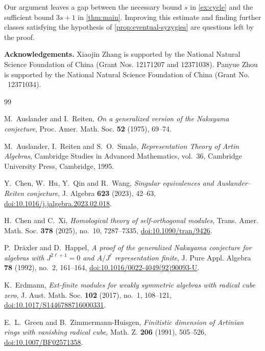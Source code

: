 \documentclass[a4paper,reqno]{amsart}
\numberwithin{equation}{section}
\begin{document}
Our argument leaves a gap between the necessary bound $s$ in
\cref{ex:cycle} and the sufficient bound $3s+1$ in \cref{thm:main}.
Improving this estimate and finding further classes satisfying the
hypothesis of \cref{prop:eventual-syzygies} are questions left by
the proof.

\textbf{Acknowledgements.} Xiaojin Zhang is supported by the National Natural Science Foundation of China (Grant Nos. 12171207 and 12371038). Panyue Zhou is supported by the National Natural Science Foundation of China (Grant No. ~12371034).
\vspace{6mm}

\begin{thebibliography}{99}

 M.~Auslander and I.~Reiten,
\emph{On a generalized version of the Nakayama conjecture},
Proc. Amer. Math. Soc. \textbf{52} (1975), 69--74.

 M.~Auslander, I.~Reiten and S.~O.~Smal\o,
\emph{Representation Theory of Artin Algebras},
Cambridge Studies in Advanced Mathematics, vol.~36,
Cambridge University Press, Cambridge, 1995.

 Y.~Chen, W.~Hu, Y.~Qin and R.~Wang,
\emph{Singular equivalences and Auslander--Reiten conjecture},
J. Algebra \textbf{623} (2023), 42--63,
\href{https://doi.org/10.1016/j.jalgebra.2023.02.018}
{doi:10.1016/j.jalgebra.2023.02.018}.

 H.~Chen and C.~Xi,
\emph{Homological theory of self-orthogonal modules},
Trans. Amer. Math. Soc. \textbf{378} (2025), no.~10, 7287--7335,
\href{https://doi.org/10.1090/tran/9426}{doi:10.1090/tran/9426}.

 P.~Dr\"axler and D.~Happel,
\emph{A proof of the generalized Nakayama conjecture for algebras with
$J^{2\ell+1}=0$ and $A/J^\ell$ representation finite},
J. Pure Appl. Algebra \textbf{78} (1992), no.~2, 161--164,
\href{https://doi.org/10.1016/0022-4049(92)90093-U}
{doi:10.1016/0022-4049(92)90093-U}.

 K.~Erdmann,
\emph{Ext-finite modules for weakly symmetric algebras with radical cube zero},
J. Aust. Math. Soc. \textbf{102} (2017), no.~1, 108--121,
\href{https://doi.org/10.1017/S1446788716000331}
{doi:10.1017/S1446788716000331}.

 E.~L.~Green and B.~Zimmermann-Huisgen,
\emph{Finitistic dimension of Artinian rings with vanishing radical cube},
Math. Z. \textbf{206} (1991), 505--526,
\href{https://doi.org/10.1007/BF02571358}{doi:10.1007/BF02571358}.


\end{thebibliography}
\end{document}
